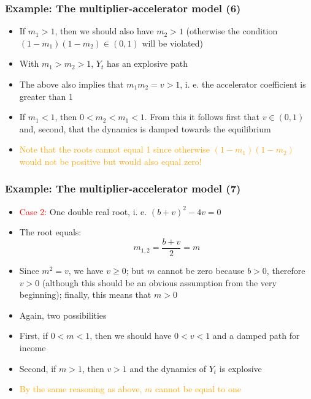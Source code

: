 \documentclass[10pt,usenames,dvipsnames]{beamer}
\theoremstyle{plain}
\theoremstyle{definition}
\begin{document}
\begin{frame}[fragile]
\frametitle{Example: The multiplier-accelerator model (6)}
\begin{itemize}
	\item If \textcolor{mygreen1}{$m_{1} > 1$}, then we should also have $m_{2} > 1$ (otherwise the condition $(1 - m_{1})(1 - m_{2}) \in (0,1)$ will be violated)
	\item With $m_{1} > m_{2} > 1$, $Y_{t}$ has an explosive path
	\item The above also implies that $m_{1}m_{2} = v > 1$, i. e. the accelerator coefficient is greater than 1
	\item If \textcolor{mygreen1}{$m_{1} < 1$}, then $0 < m_{2} < m_{1} < 1$. From this it follows first that $v \in (0,1)$ and, second, that the dynamics is damped towards the equilibrium
	\item \textcolor{orange}{Note that the roots cannot equal 1 since otherwise $(1 - m_{1})(1 - m_{2})$ would not be positive but would also equal zero!}
\end{itemize}
\end{frame}

\begin{frame}[fragile]
\frametitle{Example: The multiplier-accelerator model (7)}
\begin{itemize}
	\item \textcolor{red}{Case 2:} One double real root, i. e. $(b+v)^{2} - 4v = 0$
	\item The root equals:
	\[
		m_{1,2} = \frac{b + v}{2} = m
	\]
	\item Since $m^{2} = v$, we have $v \geq 0$; but $m$ cannot be zero because $b > 0$, therefore $v > 0$ (although this should be an obvious assumption from the very beginning); finally, this means that $m > 0$
	\item Again, two possibilities
	\item First, if $0 < m < 1$, then we should have $0 < v < 1$ and a damped path for income
	\item Second, if $m > 1$, then $v > 1$ and the dynamics of $Y_{t}$ is explosive
	\item \textcolor{orange}{By the same reasoning as above, $m$ cannot be equal to one} 
\end{itemize}
\end{frame}
\end{document}
